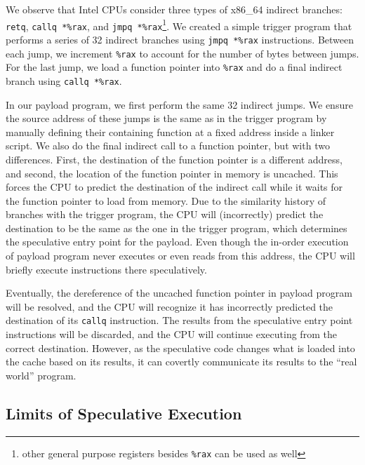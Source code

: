 We observe that Intel CPUs consider three types of x86\_64 indirect branches:
\texttt{retq}, \texttt{callq *\%rax}, and \texttt{jmpq *\%rax}\footnote{other
general purpose registers besides \texttt{\%rax} can be used as well}.
We created a simple trigger program that performs a series of 32 indirect
branches
using \texttt{jmpq *\%rax} instructions. Between each jump, we increment
\texttt{\%rax} to account for the number of bytes between jumps. For the last
jump, we load a function pointer into \texttt{\%rax} and do a final indirect
branch using \texttt{callq *\%rax}.

In our payload program, we first perform the same 32 indirect jumps. We ensure
the source address of these jumps is the same as in the trigger program by
manually defining their containing function at a fixed address inside a linker
script. We also do the final indirect call to a function pointer, but with two
differences. First, the destination of the function pointer is a different
address, and second, the location of the function pointer in memory is uncached.
This forces the CPU to predict the destination of the indirect call while it
waits for the function pointer to load from memory. Due to the similarity
history of branches with the trigger program,
the CPU will (incorrectly) predict the destination to be the same as the one in
the trigger program, which determines the speculative entry point for the
payload. Even though the in-order execution of
payload program never executes or even reads from this address, the CPU will
briefly execute instructions there speculatively.

Eventually, the dereference of the uncached function pointer in payload program
will be resolved, and the CPU will recognize it has incorrectly predicted the
destination of its \texttt{callq} instruction. The results from the speculative
entry point instructions will be discarded, and the CPU will continue executing
from the correct destination. However, as the speculative code changes what is
loaded into the cache based on its results, it can covertly communicate its
results to the ``real world'' program.



\subsection{Limits of Speculative Execution}

\FigCacheMiss

\FigSpecMeasure

